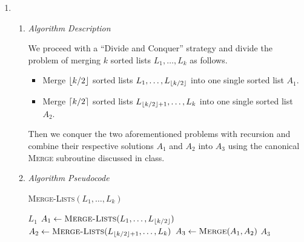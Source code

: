 \documentclass[10pt, letterpaper]{article}
\begin{document}

\begin{enumerate}[label={\bfseries Q\arabic*.}]
  \item
    \begin{enumerate}
      \item
        {\itshape Algorithm Description} \\ \vspace{-4mm}

        We proceed with a ``Divide and Conquer'' strategy and divide the problem of merging $k$ sorted lists
        $L_1,\dots,L_k$ as follows.

        \begin{itemize}
          \item Merge $\lfloor k/2 \rfloor$ sorted lists $L_1,\dots,L_{\lfloor k/2 \rfloor}$ into one single sorted list $A_1$.
          \item Merge $\lceil k/2 \rceil$ sorted lists $L_{\lfloor k/2 \rfloor + 1},\dots,L_k$ into one single sorted list $A_2$.
        \end{itemize}

        Then we conquer the two aforementioned problems with recursion and combine their respective solutions
        $A_1$ and $A_2$ into $A_3$ using the canonical \textsc{Merge} subroutine discussed in class.

      \item
        {\itshape Algorithm Pseudocode}
        \vspace{-5mm}
        \begin{center}
          \begin{minipage}{\linewidth}
            \begin{algorithm}[H]
              \caption{\textsc{Merge-Lists}$(L_1, \ldots, L_k)$}\label{alg:merge-lists}
              \begin{algorithmic}[1]
                 
                  \State \Return $L_1$
                \EndIf
                \State $A_1 \gets \textsc{Merge-Lists}(L_1, \ldots, L_{\lfloor k/2 \rfloor})$ 
                \State $A_2 \gets \textsc{Merge-Lists}(L_{\lfloor k/2 \rfloor + 1}, \ldots, L_k)$ 
                \State $A_3 \gets \textsc{Merge}(A_1, A_2)$ 
                \State \Return $A_3$ 
              \end{algorithmic}
            \end{algorithm}
          \end{minipage}
        \end{center}


\end{enumerate}
\end{enumerate}
\end{document}
